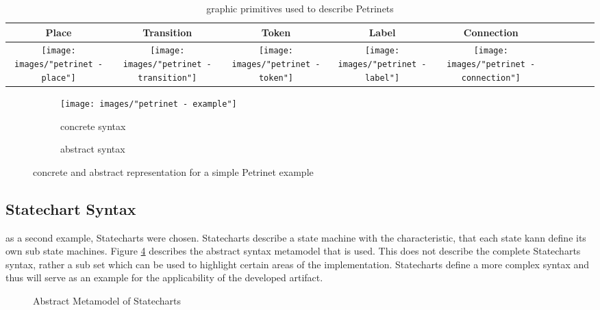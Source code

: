 \begin{table}[ht]
  \centering
\begin{tabular}[width=.1\linewidth]{| Sc | Sc | Sc | Sc | Sc |}
  \hline
  Place & Transition & Token & Label & Connection 
  \\
  \hline
  \texttt{[image: images/"petrinet - place"]} 
  & 
  \texttt{[image: images/"petrinet - transition"]} 
  & 
  \texttt{[image: images/"petrinet - token"]}
  & 
  \texttt{[image: images/"petrinet - label"]}
  & 
  \texttt{[image: images/"petrinet - connection"]} 
  \\
  \hline
\end{tabular}
\caption{graphic primitives used to describe Petrinets}
\label{tab:petri-primitives}
\end{table}

\begin{figure}[ht!]
  \centering
  \begin{subfigure}[t]{.4\textwidth}
    \centering
    \texttt{[image: images/"petrinet - example"]}
    \caption{concrete syntax}
    \label{subfig:petriconcrete}    
  \end{subfigure}
  \begin{subfigure}[t]{.45\textwidth}
    \centering
    
    \caption{abstract syntax}
    \label{subfig:petriabstract}    
  \end{subfigure}
  \caption{concrete and abstract representation for a simple Petrinet example}
  \label{fig:petrinets_example}
\end{figure} 

\subsection{Statechart Syntax}
\label{sec:statecharts}
as a second example, Statecharts were chosen. Statecharts describe a state machine with the characteristic, that each state kann define its own sub state machines. Figure \ref{fig:statechartmm} describes the abstract syntax metamodel that is used. This does not describe the complete Statecharts syntax, rather a sub set which can be used to highlight certain areas of the implementation. Statecharts define a more complex syntax and thus will serve as an example for the applicability of the developed artifact.

\begin{figure}
\centering

\caption{Abstract Metamodel of Statecharts}
\label{fig:statechartmm}
\end{figure}

